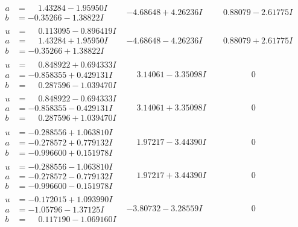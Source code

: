 \documentclass[1p]{elsarticle_modified}
\theoremstyle{definition}
\begin{document}
$$\begin{array}{c|c|c}
\begin{aligned}
a &= \phantom{-}1.43284 - 1.95950 I \\
b &= -0.35266 - 1.38822 I\end{aligned}
 & -4.68648 + 4.26236 I & \phantom{-}0.88079 - 2.61775 I \\ \hline\begin{aligned}
u &= \phantom{-}0.113095 - 0.896419 I \\
a &= \phantom{-}1.43284 + 1.95950 I \\
b &= -0.35266 + 1.38822 I\end{aligned}
 & -4.68648 - 4.26236 I & \phantom{-}0.88079 + 2.61775 I \\ \hline\begin{aligned}
u &= \phantom{-}0.848922 + 0.694333 I \\
a &= -0.858355 + 0.429131 I \\
b &= \phantom{-}0.287596 - 1.039470 I\end{aligned}
 & \phantom{-}3.14061 - 3.35098 I & \phantom{-0.000000 } 0 \\ \hline\begin{aligned}
u &= \phantom{-}0.848922 - 0.694333 I \\
a &= -0.858355 - 0.429131 I \\
b &= \phantom{-}0.287596 + 1.039470 I\end{aligned}
 & \phantom{-}3.14061 + 3.35098 I & \phantom{-0.000000 } 0 \\ \hline\begin{aligned}
u &= -0.288556 + 1.063810 I \\
a &= -0.278572 + 0.779132 I \\
b &= -0.996600 + 0.151978 I\end{aligned}
 & \phantom{-}1.97217 - 3.44390 I & \phantom{-0.000000 } 0 \\ \hline\begin{aligned}
u &= -0.288556 - 1.063810 I \\
a &= -0.278572 - 0.779132 I \\
b &= -0.996600 - 0.151978 I\end{aligned}
 & \phantom{-}1.97217 + 3.44390 I & \phantom{-0.000000 } 0 \\ \hline\begin{aligned}
u &= -0.172015 + 1.093990 I \\
a &= -1.05796 - 1.37125 I \\
b &= \phantom{-}0.117190 - 1.069160 I\end{aligned}
 & -3.80732 - 3.28559 I & \phantom{-0.000000 } 0 \\ \hline\begin{aligned}

\end{aligned}
\end{array}$$
\end{document}
